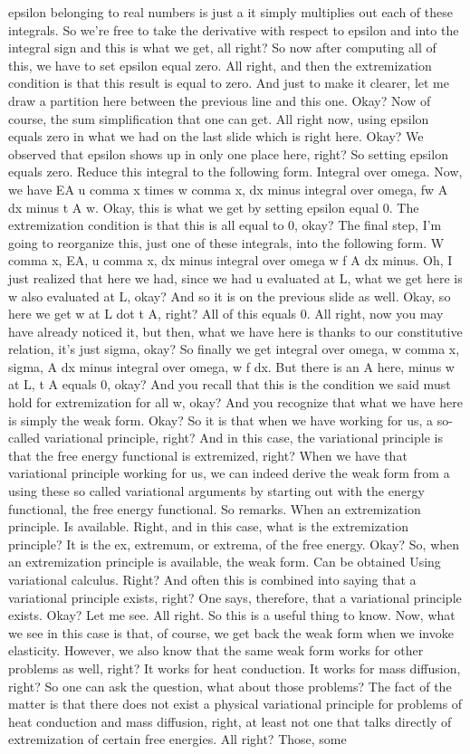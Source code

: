 \documentclass[10pt]{article}
\begin{document}
epsilon belonging to real numbers is just a it simply multiplies out each of these integrals. So we're free to take the derivative with respect to epsilon and into the integral sign and this is what we get, all right? So now after computing all of this, we have to set epsilon equal zero. All right, and then the extremization condition is that this result is equal to zero. And just to make it clearer, let me draw a partition here between the previous line and this one. Okay? Now of course, the sum simplification that one can get. All right now, using epsilon equals zero in what we had on the last slide which is right here. Okay? We observed that epsilon shows up in only one place here, right? So setting epsilon equals zero. Reduce this integral to the following form. Integral over omega. Now, we have EA u comma x times w comma x, dx minus integral over omega, fw A dx minus t A w. Okay, this is what we get by setting epsilon equal 0. The extremization condition is that this is all equal to 0, okay? The final step, I'm going to reorganize this, just one of these integrals, into the following form. W comma x, EA, u comma x, dx minus integral over omega w f A dx minus. Oh, I just realized that here we had, since we had u evaluated at L, what we get here is w also evaluated at L, okay? And so it is on the previous slide as well. Okay, so here we get w at L dot t A, right? All of this equals 0. All right, now you may have already noticed it, but then, what we have here is thanks to our constitutive relation, it's just sigma, okay? So finally we get integral over omega, w comma x, sigma, A dx minus integral over omega, w f dx. But there is an A here, minus w at L, t A equals 0, okay? And you recall that this is the condition we said must hold for extremization for all w, okay? And you recognize that what we have here is simply the weak form. Okay? So it is that when we have working for us, a so-called variational principle, right? And in this case, the variational principle is that the free energy functional is extremized, right? When we have that variational principle working for us, we can indeed derive the weak form from a using these so called variational arguments by starting out with the energy functional, the free energy functional. So remarks. When an extremization principle. Is available. Right, and in this case, what is the extremization principle? It is the ex, extremum, or extrema, of the free energy. Okay? So, when an extremization principle is available, the weak form. Can be obtained Using variational calculus. Right? And often this is combined into saying that a variational principle exists, right? One says, therefore, that a variational principle exists. Okay? Let me see. All right. So this is a useful thing to know. Now, what we see in this case is that, of course, we get back the weak form when we invoke elasticity. However, we also know that the same weak form works for other problems as well, right? It works for heat conduction. It works for mass diffusion, right? So one can ask the question, what about those problems? The fact of the matter is that there does not exist a physical variational principle for problems of heat conduction and mass diffusion, right, at least not one that talks directly of extremization of certain free energies. All right? Those, some 
\end{document}
